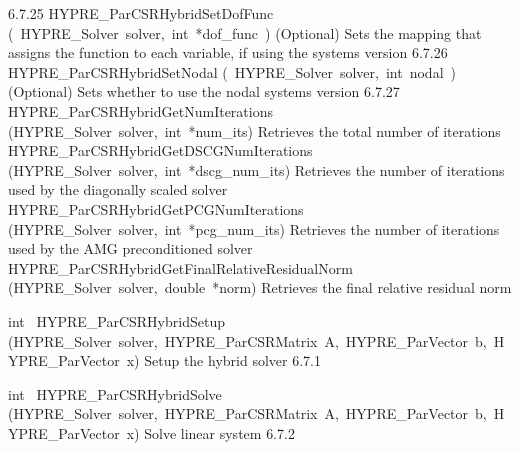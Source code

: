 \documentclass{article}
\begin{document}
\begin{cxxentry}
\begin{cxxentry}
\begin{cxxnames}
        {6.7.25}
        {HYPRE\_ParCSRHybridSetDofFunc}
        {(\ HYPRE\_Solver\ solver,\ int\ *dof\_func\ )}
        {
(Optional) Sets the mapping that assigns the function to each variable,
if using the systems version}
        {6.7.26}
        {HYPRE\_ParCSRHybridSetNodal}
        {(\ HYPRE\_Solver\ solver,\ int\ nodal\ )}
        {
(Optional) Sets whether to use the nodal systems version}
        {6.7.27}
        {HYPRE\_ParCSRHybridGetNumIterations}
        {(HYPRE\_Solver\ solver,\ int\ *num\_its)}
        {
Retrieves the total number of iterations}
        {}
\label{cxx.6.7.38}
        {HYPRE\_ParCSRHybridGetDSCGNumIterations}
        {(HYPRE\_Solver\ solver,\ int\ *dscg\_num\_its)}
        {
Retrieves the number of iterations used by the diagonally scaled solver}
        {}
\label{cxx.6.7.39}
        {HYPRE\_ParCSRHybridGetPCGNumIterations}
        {(HYPRE\_Solver\ solver,\ int\ *pcg\_num\_its)}
        {
Retrieves the number of iterations used by the AMG preconditioned solver}
        {}
\label{cxx.6.7.40}
        {HYPRE\_ParCSRHybridGetFinalRelativeResidualNorm}
        {(HYPRE\_Solver\ solver,\ double\ *norm)}
        {
Retrieves the final relative residual norm}
        {}
\label{cxx.6.7.41}
\end{cxxnames}
\begin{cxxfunction}
{int\ }
        {HYPRE\_ParCSRHybridSetup}
        {(HYPRE\_Solver\ solver,\ HYPRE\_ParCSRMatrix\ A,\ HYPRE\_ParVector\ b,\ HYPRE\_ParVector\ x)}
        {
Setup the hybrid solver
}
        {6.7.1}
\begin{cxxdoc}

\end{cxxdoc}
\end{cxxfunction}
\begin{cxxfunction}
{int\ }
        {HYPRE\_ParCSRHybridSolve}
        {(HYPRE\_Solver\ solver,\ HYPRE\_ParCSRMatrix\ A,\ HYPRE\_ParVector\ b,\ HYPRE\_ParVector\ x)}
        {
Solve linear system
}
        {6.7.2}
\begin{cxxdoc}


\end{cxxdoc}
\end{cxxfunction}
\end{cxxentry}
\end{cxxentry}
\end{document}
